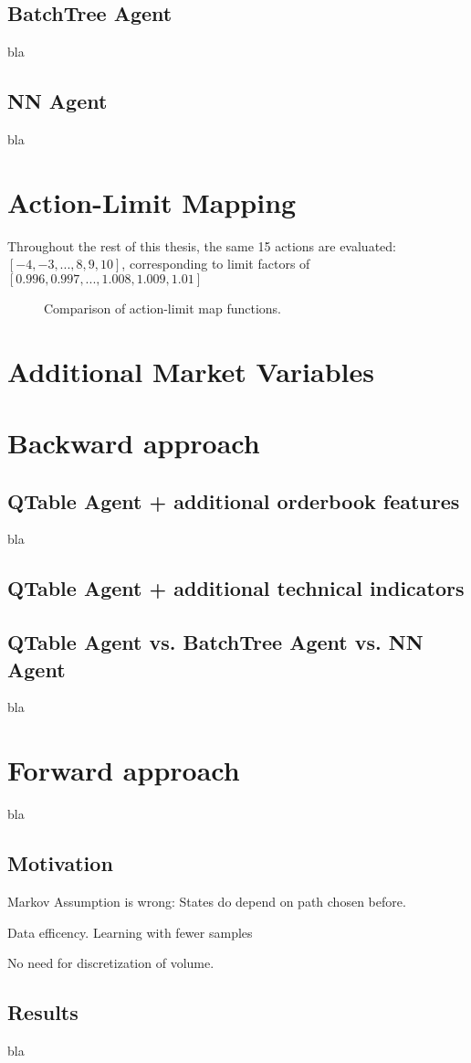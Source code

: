 \subsection{BatchTree Agent}
bla

\subsection{NN Agent}
bla


\section{Action-Limit Mapping}
\label{chap:exp:actionlimitmapping}
Throughout the rest of this thesis, the same 15 actions are evaluated: $[-4, -3, ..., 8, 9, 10]$, corresponding to limit factors of $[0.996, 0.997, ..., 1.008, 1.009, 1.01]$\\

\begin{figure}[ht]
	\centering
	[placeholder]
	\caption{Comparison of action-limit map functions.}
	\label{fig:actionlimitmapping}
\end{figure}

\section{Additional Market Variables}
\label{chap:exp:additionalmarketvars}


\section{Backward approach}

\subsection{QTable Agent + additional orderbook features}
bla

\subsection{QTable Agent + additional technical indicators}

\subsection{QTable Agent vs. BatchTree Agent vs. NN Agent}
bla




\section{Forward approach}
\label{chap:forwardlearning}
bla

\subsection{Motivation}
Markov Assumption is wrong: States do depend on path chosen before.

Data efficency. Learning with fewer samples

No need for discretization of volume.

\subsection{Results}
bla





\cleardoublepage{}